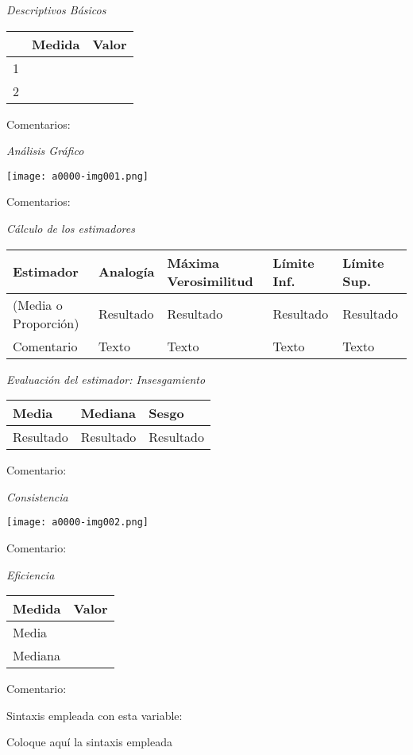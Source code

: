 \documentclass[letterpaper]{article}
\begin{document}
\bigskip
\textit{Descriptivos Básicos}

\begin{center}
\begin{longtable}{|m{1.8cm}|m{2cm}|m{2cm}|}
\hline
 & Medida & Valor \\\hline
1 & ~ & ~ \\\hline
2 & ~ & ~ \\\hline
\end{longtable}
\end{center}

Comentarios:

\bigskip
\textit{Análisis Gráfico}

\begin{center}
\texttt{[image: a0000-img001.png]}
\end{center}

Comentarios:

\bigskip
\textit{Cálculo de los estimadores}

\begin{center}
\begin{longtable}{|m{2cm}|m{2cm}|m{2cm}|m{2cm}|m{2cm}|}
\hline
Estimador & Analogía & Máxima Verosimilitud & Límite Inf. & Límite Sup.\\\hline
(Media o Proporción) & Resultado & Resultado & Resultado & Resultado\\\hline
Comentario & Texto & Texto & Texto & Texto\\\hline
\end{longtable}
\end{center}

\bigskip
\textit{Evaluación del estimador: Insesgamiento}

\begin{center}
\begin{longtable}{|m{3cm}|m{3cm}|m{3cm}|}
\hline
Media & Mediana & Sesgo\\\hline
Resultado & Resultado & Resultado\\\hline
\end{longtable}
\end{center}

Comentario:

\bigskip
\textit{Consistencia}

\begin{center}
\texttt{[image: a0000-img002.png]}
\end{center}

Comentario:

\bigskip
\textit{Eficiencia}

\begin{center}
\begin{longtable}{|m{2cm}|m{2cm}|}
\hline
Medida & Valor\\\hline
Media & ~\\\hline
Mediana & ~\\\hline
\end{longtable}
\end{center}

Comentario:

\bigskip
Sintaxis empleada con esta variable:

\bigskip
Coloque aquí la sintaxis empleada
\end{document}
